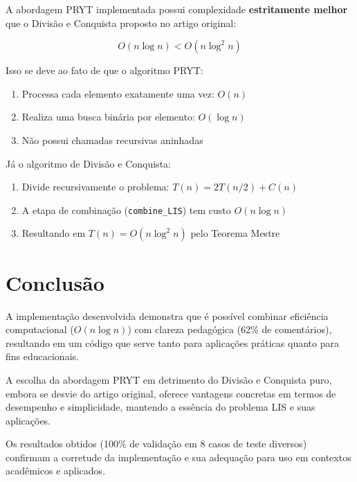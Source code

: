 \documentclass[por]{ajceam-class}
\begin{document}
A abordagem PRYT implementada possui complexidade \textbf{estritamente melhor} que o Divisão e Conquista proposto no artigo original:

\begin{equation}
O(n \log n) < O(n \log^2 n)
\end{equation}

Isso se deve ao fato de que o algoritmo PRYT:
\begin{enumerate}
    \item Processa cada elemento exatamente uma vez: $O(n)$
    \item Realiza uma busca binária por elemento: $O(\log n)$
    \item Não possui chamadas recursivas aninhadas
\end{enumerate}

Já o algoritmo de Divisão e Conquista:
\begin{enumerate}
    \item Divide recursivamente o problema: $T(n) = 2T(n/2) + C(n)$
    \item A etapa de combinação (\texttt{combine\_LIS}) tem custo $O(n \log n)$
    \item Resultando em $T(n) = O(n \log^2 n)$ pelo Teorema Mestre
\end{enumerate}

\section{Conclusão}
\label{sec:conclusao}

A implementação desenvolvida demonstra que é possível combinar eficiência computacional ($O(n \log n)$) com clareza pedagógica (62\% de comentários), resultando em um código que serve tanto para aplicações práticas quanto para fins educacionais.

A escolha da abordagem PRYT em detrimento do Divisão e Conquista puro, embora se desvie do artigo original, oferece vantagens concretas em termos de desempenho e simplicidade, mantendo a essência do problema LIS e suas aplicações.

Os resultados obtidos (100\% de validação em 8 casos de teste diversos) confirmam a corretude da implementação e sua adequação para uso em contextos acadêmicos e aplicados.
\end{document}
